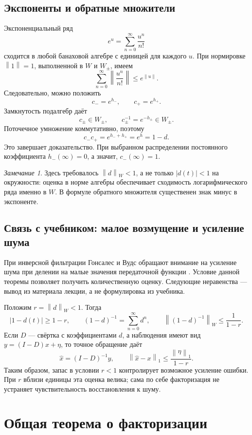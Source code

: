 \documentclass[12pt,a4paper]{article}
\theoremstyle{definition}
\theoremstyle{remark}
\newtheorem*{remark}{Замечание}
\newcommand{\norm}[1]{\left\lVert #1\right\rVert}
\begin{document}
\subsection{Экспоненты и обратные множители}

Экспоненциальный ряд
\[
  e^u=\sum_{n=0}^{\infty}\frac{u^n}{n!}
\]
сходится в любой банаховой алгебре с единицей для каждого $u$.
При нормировке $\norm{1}=1$, выполненной в $W$ и $W_\pm$, имеем
\[
  \sum_{n=0}^{\infty}\left\lVert\frac{u^n}{n!}\right\rVert
  \leqslant e^{\norm{u}}.
\]
Следовательно, можно положить
\[
  c_-=e^{h_-},\qquad c_+=e^{h_+}.
\]
Замкнутость подалгебр даёт
\[
  c_\pm\in W_\pm,\qquad c_\pm^{-1}=e^{-h_\pm}\in W_\pm.
\]
Поточечное умножение коммутативно, поэтому
\[
  c_-c_+=e^{h_-+h_+}=e^h=1-d.
\]
Это завершает доказательство. При выбранном распределении
постоянного коэффициента $h_-(\infty)=0$, а значит, $c_-(\infty)=1$.

\begin{remark}
Здесь требовалось $\norm{d}_W<1$, а не только $|d(t)|<1$ на окружности:
оценка в норме алгебры обеспечивает сходимость логарифмического ряда
именно в $W$. В формуле обратного множителя существенен знак минус
в экспоненте.
\end{remark}

\subsection{Связь с учебником: малое возмущение и усиление шума}

При инверсной фильтрации Гонсалес и Вудс обращают внимание на усиление
шума при делении на малые значения передаточной функции
\cite[\S\,5.7, с.~412]{GW2012}. Условие данной теоремы позволяет
получить количественную оценку. Следующие неравенства --- вывод
из материала лекции, а не формулировка из учебника.

Положим $r=\norm{d}_W<1$. Тогда
\[
  |1-d(t)|\geqslant1-r,\qquad
  (1-d)^{-1}=\sum_{n=0}^{\infty}d^n,\qquad
  \norm{(1-d)^{-1}}_W\leqslant\frac1{1-r}.
\]
Если $D$ --- свёртка с коэффициентами $d$, а наблюдения имеют вид
$y=(I-D)x+\eta$, то точное обращение даёт
\[
  \widehat x=(I-D)^{-1}y,\qquad
  \norm{\widehat x-x}_1\leqslant\frac{\norm{\eta}_1}{1-r}.
\]
Таким образом, запас в условии $r<1$ контролирует возможное усиление
ошибки. При $r$ вблизи единицы эта оценка велика; сама по себе
факторизация не устраняет чувствительность восстановления к шуму.

\section{Общая теорема о факторизации}
\end{document}
